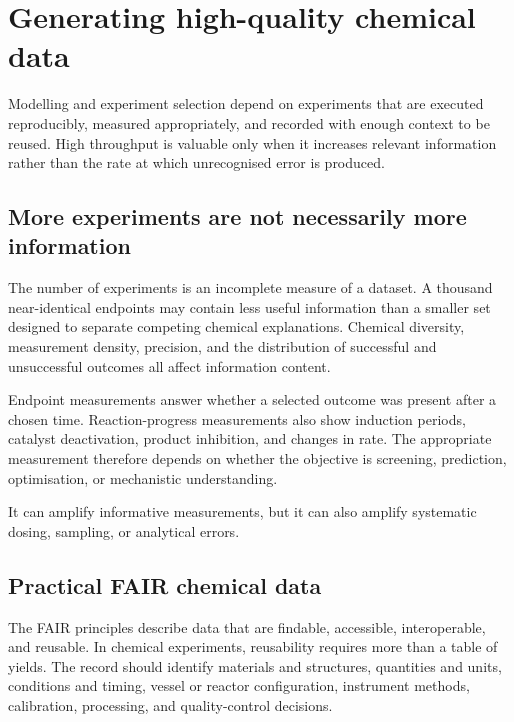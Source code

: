
\chapter{Generating high-quality chemical data}

\begin{notebox}
  Modelling and experiment selection depend on experiments that are executed reproducibly, measured appropriately, and recorded with enough context to be reused.
  High throughput is valuable only when it increases relevant information rather than the rate at which unrecognised error is produced.
\end{notebox}

\section{More experiments are not necessarily more information}

The number of experiments is an incomplete measure of a dataset.
A thousand near-identical endpoints may contain less useful information than a smaller set designed to separate competing chemical explanations.
Chemical diversity, measurement density, precision, and the distribution of successful and unsuccessful outcomes all affect information content.

Endpoint measurements answer whether a selected outcome was present after a chosen time.
Reaction-progress measurements also show induction periods, catalyst deactivation, product inhibition, and changes in rate.
The appropriate measurement therefore depends on whether the objective is screening, prediction, optimisation, or mechanistic understanding.

\begin{warningbox}
  It can amplify informative measurements, but it can also amplify systematic dosing, sampling, or analytical errors.
\end{warningbox}

\section{Practical FAIR chemical data}

The FAIR principles describe data that are findable, accessible, interoperable, and reusable.
In chemical experiments, reusability requires more than a table of yields.
The record should identify materials and structures, quantities and units, conditions and timing, vessel or reactor configuration, instrument methods, calibration, processing, and quality-control decisions.

